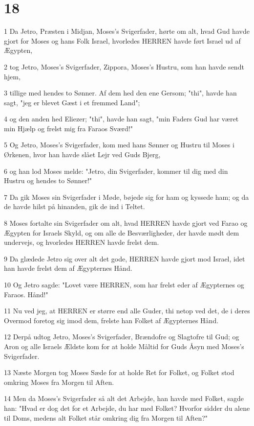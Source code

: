 \chapter{18}

\par 1 Da Jetro, Præsten i Midjan, Moses's Svigerfader, hørte om alt, hvad Gud havde gjort for Moses og hans Folk Israel, hvorledes HERREN havde ført Israel ud af Ægypten,
\par 2 tog Jetro, Moses's Svigerfader, Zippora, Moses's Hustru, som han havde sendt hjem,
\par 3 tillige med hendes to Sønner. Af dem hed den ene Gersom; "thi", havde han sagt, "jeg er blevet Gæst i et fremmed Land";
\par 4 og den anden hed Eliezer; "thi", havde han sagt, "min Faders Gud har været min Hjælp og frelst mig fra Faraos Sværd!"
\par 5 Og Jetro, Moses's Svigerfader, kom med hans Sønner og Hustru til Moses i Ørkenen, hvor han havde slået Lejr ved Guds Bjerg,
\par 6 og han lod Moses melde: "Jetro, din Svigerfader, kommer til dig med din Hustru og hendes to Sønner!"
\par 7 Da gik Moses sin Svigerfader i Møde, bøjede sig for ham og kyssede ham; og da de havde hilst på hinanden, gik de ind i Teltet.
\par 8 Moses fortalte sin Svigerfader om alt, hvad HERREN havde gjort ved Farao og Ægypten for Israels Skyld, og om alle de Besværligheder, der havde mødt dem undervejs, og hvorledes HERREN havde frelst dem.
\par 9 Da glædede Jetro sig over alt det gode, HERREN havde gjort mod Israel, idet han havde frelst dem af Ægypternes Hånd.
\par 10 Og Jetro sagde: "Lovet være HERREN, som har frelst eder af Ægypternes og Faraos. Hånd!"
\par 11 Nu ved jeg, at HERREN er større end alle Guder, thi netop ved det, de i deres Overmod foretog sig imod dem, frelste han Folket af Ægypternes Hånd.
\par 12 Derpå udtog Jetro, Moses's Svigerfader, Brændofre og Slagtofre til Gud; og Aron og alle Israels Ældste kom for at holde Måltid for Guds Åsyn med Moses's Svigerfader.
\par 13 Næste Morgen tog Moses Sæde for at holde Ret for Folket, og Folket stod omkring Moses fra Morgen til Aften.
\par 14 Men da Moses's Svigerfader så alt det Arbejde, han havde med Folket, sagde han: "Hvad er dog det for et Arbejde, du har med Folket? Hvorfor sidder du alene til Doms, medens alt Folket står omkring dig fra Morgen til Aften?"
